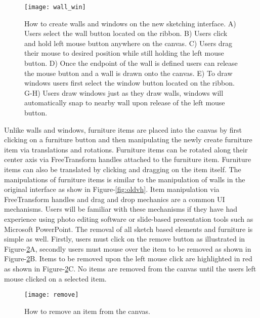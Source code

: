 		\begin{figure}[t]
		\centering
		\texttt{[image: wall\_win]}
		\caption{How to create walls and windows on the new sketching interface. A) Users select the wall button located on the ribbon. B) Users click and hold left mouse button anywhere on the canvas. C) Users drag their mouse to desired position while still holding the left mouse button. D) Once the endpoint of the wall is defined users can release the mouse button and a wall is drawn onto the canvas. E) To draw  windows users first select the window button located on the ribbon. G-H) Users draw windows just as they draw walls, windows will automatically snap to nearby wall upon release of the left mouse button. }
		\label{fig:wall_win}
		\end{figure}

		Unlike walls and windows, furniture items are placed into the canvas by first clicking on a furniture button  and then manipulating the newly create furniture item via translations and rotations. 
		Furniture items can be rotated along their center axis via FreeTransform handles attached to the furniture item.
		Furniture items can also be translated by clicking and dragging on the item itself.
		The manipulations of furniture items is similar to the manipulation of walls in the original interface as show in Figure-\ref{fig:oldvh}.
		Item manipulation via FreeTransform handles and drag and drop mechanics are a common UI mechanisms. 
		Users will be familiar with these mechanisms if they have had experience using photo editing software or slide-based presentation tools such as Microsoft PowerPoint\cite{}.
		The removal of all sketch based elements and furniture is simple as well.
		Firstly, users must click on the remove button as illustrated in Figure-\ref{fig:remove}A, secondly users must mouse over the item to be removed as shown in Figure-\ref{fig:remove}B.
		Items to be removed upon the left mouse click are highlighted in red as shown in Figure-\ref{fig:remove}C.
		No items are removed from the canvas until the users left mouse clicked on a selected item.
		
		\begin{figure}[t]
		\centering
		\texttt{[image: remove]}
		\caption{How to remove an item from the canvas. 
		}
		\label{fig:remove}
		\end{figure}

